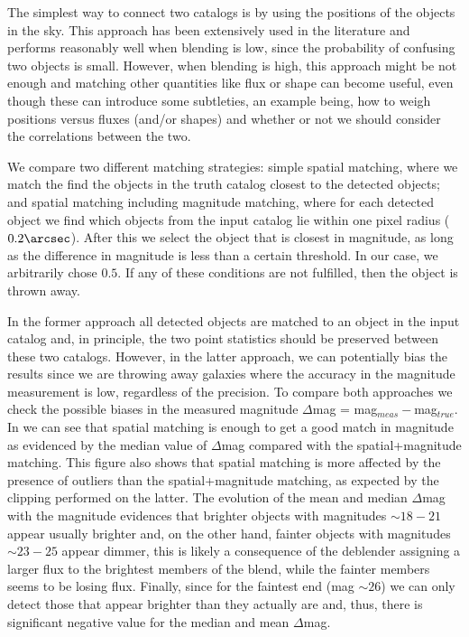 \documentclass[\docopts]{\docclass}
\begin{document}
The simplest way to connect two catalogs is by using the positions of the objects in the sky. This approach has been extensively used in the literature and performs reasonably well when blending is low, since the probability of confusing two objects is small. However, when blending is high, this approach might be not enough and matching other quantities like flux or shape can become useful, even though these can introduce some subtleties, an example being, how to weigh positions versus fluxes (and/or shapes) and whether or not we should consider the correlations between the two.

We compare two different matching strategies: simple spatial matching, where we match the find the objects in the truth catalog closest to the detected objects; and spatial matching including magnitude matching, where for each detected object we find which objects from the input catalog lie within one pixel radius ($0.2 \arcsec$). After this we select the object that is closest in magnitude, as long as the difference in magnitude is less than a certain threshold. In our case, we arbitrarily chose $0.5$. If any of these conditions are not fulfilled, then the object is thrown away.

In the former approach all detected objects are matched to an object in the input catalog and, in principle, the two point statistics should be preserved between these two catalogs. However, in the latter approach, we can potentially bias the results since we are throwing away galaxies where the accuracy in the magnitude measurement is low, regardless of the precision. To compare both approaches we check the possible biases in the measured magnitude $\Delta$mag = mag$_{meas} - $mag$_{true}$. In  we can see that spatial matching is enough to get a good match in magnitude as evidenced by the median value of $\Delta$mag compared with the spatial+magnitude matching. This figure also shows that spatial matching is more affected by the presence of outliers than the spatial+magnitude matching, as expected by the clipping performed on the latter. The evolution of the mean and median $\Delta$mag with the magnitude evidences that brighter objects with magnitudes $\sim 18-21$ appear usually brighter and, on the other hand, fainter objects with magnitudes $\sim 23-25$ appear dimmer, this is likely a consequence of the deblender assigning a larger flux to the brightest members of the blend, while the fainter members seems to be losing flux. Finally, since for the faintest end (mag $\sim 26$) we can only detect those that appear brighter than they actually are and, thus, there is significant negative value for the median and mean $\Delta$mag.
\end{document}
